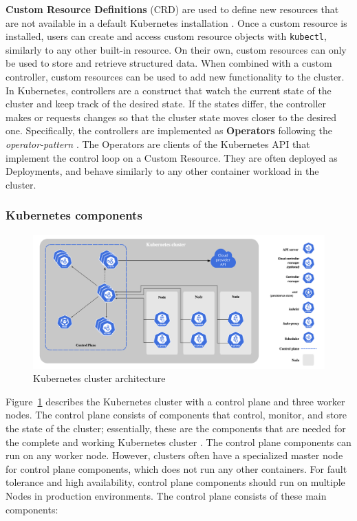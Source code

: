 \documentclass[english, 12pt, a4paper, sci, utf8, a-2b, online]{aaltothesis}
\begin{document}
\textbf{Custom Resource Definitions} (CRD) are used to define new resources that are not available in a default Kubernetes installation \cite{k8s-docs-crd}.
Once a custom resource is installed, users can create and access custom resource objects with \texttt{kubectl}, similarly to any other built-in resource.
On their own, custom resources can only be used to store and retrieve structured data.
When combined with a custom controller, custom resources can be used to add new functionality to the cluster.
In Kubernetes, controllers are a construct that watch the current state of the cluster and keep track of the desired state.
If the states differ, the controller makes or requests changes so that the cluster state moves closer to the desired one.
Specifically, the controllers are implemented as \textbf{Operators} following the \emph{operator-pattern} \cite{k8s-docs-operators}.
The Operators are clients of the Kubernetes API that implement the control loop on a Custom Resource.
They are often deployed as Deployments, and behave similarly to any other container workload in the cluster.

\subsubsection{Kubernetes components} \label{control-plane}

\begin{figure}[h!]
  \centering
  \includegraphics[width=\linewidth]{files/k8s-arch.png}
  \caption{Kubernetes cluster architecture \cite{k8s-docs-control-plane}}
  \label{figure-2}
\end{figure}

Figure~\ref{figure-2} describes the Kubernetes cluster with a control plane and three worker nodes.
The control plane consists of components that control, monitor, and store the state of the cluster; essentially, these are the components that are needed for the complete and working Kubernetes cluster \cite{k8s-docs-control-plane}.
The control plane components can run on any worker node.
However, clusters often have a specialized master node for control plane components, which does not run any other containers.
For fault tolerance and high availability, control plane components should run on multiple Nodes in production environments.
The control plane consists of these main components:
\end{document}

